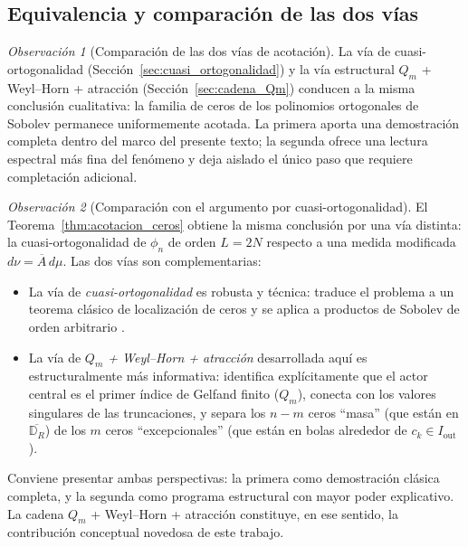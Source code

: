 \documentclass[12pt,a4paper]{article}
\theoremstyle{definition}
\theoremstyle{remark}
\newtheorem{remark}{Observación}
\begin{document}
\subsection{Equivalencia y comparación de las dos vías}\label{sec:equivalencia_vias}

\begin{remark}[Comparación de las dos vías de acotación]\label{prop:equivalencia_vias}
  La vía de cuasi-ortogonalidad (Sección~\ref{sec:cuasi_ortogonalidad}) y la vía estructural $Q_m$ + Weyl--Horn + atracción (Sección~\ref{sec:cadena_Qm}) conducen a la misma conclusión cualitativa: la familia de ceros de los polinomios ortogonales de Sobolev permanece uniformemente acotada. La primera aporta una demostración completa dentro del marco del presente texto; la segunda ofrece una lectura espectral más fina del fenómeno y deja aislado el único paso que requiere completación adicional.
\end{remark}

\begin{remark}[Comparación con el argumento por cuasi-ortogonalidad]\label{rem:comparacion_vias}
  El Teorema~\ref{thm:acotacion_ceros} obtiene la misma conclusión por una vía distinta: la cuasi-ortogonalidad de $\phi_n$ de orden $L=2N$ respecto a una medida modificada $d\nu=\overline{A}\,d\mu$. Las dos vías son complementarias:
  \begin{itemize}
    \item La vía de \emph{cuasi-ortogonalidad} es robusta y técnica: traduce el problema a un teorema clásico de localización de ceros y se aplica a productos de Sobolev de orden arbitrario \cite{lopez1999zero}.
    \item La vía de \emph{$Q_m$ + Weyl--Horn + atracción} desarrollada aquí es estructuralmente más informativa: identifica explícitamente que el actor central es el primer índice de Gelfand finito ($Q_m$), conecta con los valores singulares de las truncaciones, y separa los $n-m$ ceros ``masa'' (que están en $\overline{\mathbb{D}_R}$) de los $m$ ceros ``excepcionales'' (que están en bolas alrededor de $c_k\in I_{\mathrm{out}}$).
  \end{itemize}

  Conviene presentar ambas perspectivas: la primera como demostración clásica completa, y la segunda como programa estructural con mayor poder explicativo. La cadena $Q_m$ + Weyl--Horn + atracción constituye, en ese sentido, la contribución conceptual novedosa de este trabajo.
\end{remark}
\end{document}
